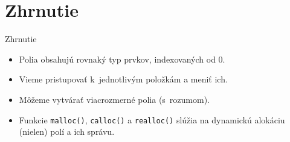 \documentclass[xcolor=dvipsnames]{beamer}
\begin{document}
\section{Zhrnutie}
\begin{frame}{Zhrnutie}
    \begin{itemize}
        \item Polia obsahujú rovnaký typ prvkov, indexovaných od 0.
        \item Vieme pristupovať k~jednotlivým položkám a meniť ich.
        \item Môžeme vytvárať viacrozmerné polia (s~rozumom).
        \item Funkcie \texttt{malloc()}, \texttt{calloc()} a \texttt{realloc()} slúžia na dynamickú alokáciu (nielen) polí a ich správu.
    \end{itemize}
\end{frame}
\end{document}
